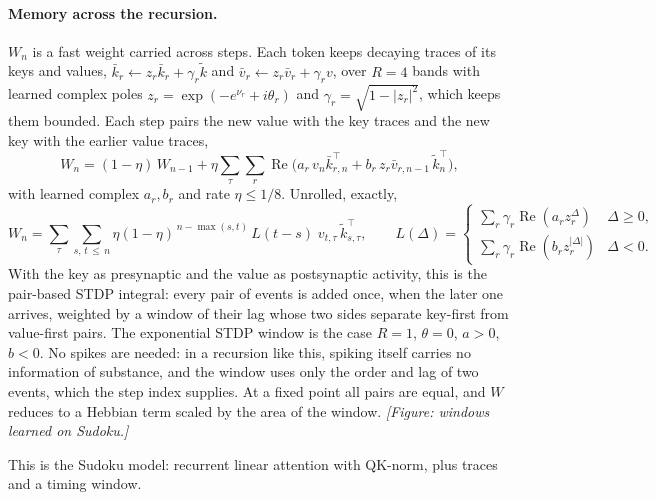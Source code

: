 \documentclass[10pt]{article}
\newcommand{\todo}[1]{\textit{[#1]}}
\newcommand{\kt}{\tilde k}
\renewcommand{\Re}{\operatorname{Re}}
\begin{document}
\paragraph{Memory across the recursion.} $W_n$ is a fast weight carried across steps. Each token keeps decaying traces
of its keys and values, $\bar k_r \leftarrow z_r \bar k_r + \gamma_r \kt$ and $\bar v_r \leftarrow z_r \bar v_r +
\gamma_r v$, over $R = 4$ bands with learned complex poles $z_r = \exp(-e^{\nu_r} + i\theta_r)$ and
$\gamma_r = \sqrt{1 - |z_r|^2}$, which keeps them bounded. Each step pairs the new value with the key traces and the new
key with the earlier value traces,
\begin{equation}
  W_n = (1-\eta)\, W_{n-1} + \eta \sum_{\tau} \sum_{r} \Re\!\big( a_r\, v_n \bar k_{r,n}^{\top}
        + b_r\, z_r \bar v_{r,n-1}\, \kt_n^{\top} \big),
  \label{eq:write}
\end{equation}
with learned complex $a_r, b_r$ and rate $\eta \le 1/8$. Unrolled, exactly,
\begin{equation}
  W_n = \sum_{\tau} \sum_{s,\,t \,\le\, n} \eta (1-\eta)^{\,n-\max(s,t)}\, L(t-s)\; v_{t,\tau}\, \kt_{s,\tau}^{\top},
  \qquad
  L(\Delta) = \begin{cases} \sum_r \gamma_r \Re(a_r z_r^{\Delta}) & \Delta \ge 0, \\
                            \sum_r \gamma_r \Re(b_r z_r^{|\Delta|}) & \Delta < 0. \end{cases}
  \label{eq:pairs}
\end{equation}
With the key as presynaptic and the value as postsynaptic activity, this is the pair-based STDP integral: every pair of
events is added once, when the later one arrives, weighted by a window of their lag whose two sides separate key-first
from value-first pairs. The exponential STDP window is the case $R = 1$, $\theta = 0$, $a > 0$, $b < 0$. No spikes are
needed: in a recursion like this, spiking itself carries no information of substance, and the window uses only the
order and lag of two events, which the step index supplies. At a fixed point all pairs are equal, and $W$ reduces to a
Hebbian term scaled by the area of the window. \todo{Figure: windows learned on Sudoku.}

This is the Sudoku model: recurrent linear attention with QK-norm, plus traces and a timing window.
\end{document}
